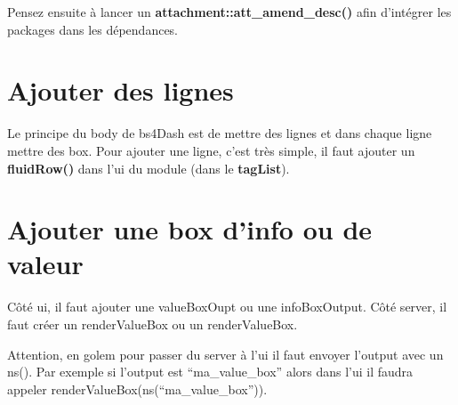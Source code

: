 \documentclass[
  letterpaper,
  DIV=11,
  numbers=noendperiod]{scrreprt}
\newenvironment{Shaded}{\begin{snugshade}}{\end{snugshade}}
\newcommand{\ControlFlowTok}[1]{\textcolor[rgb]{0.00,0.23,0.31}{#1}}
\newcommand{\FunctionTok}[1]{\textcolor[rgb]{0.28,0.35,0.67}{#1}}
\newcommand{\NormalTok}[1]{\textcolor[rgb]{0.00,0.23,0.31}{#1}}
\newcommand{\OtherTok}[1]{\textcolor[rgb]{0.00,0.23,0.31}{#1}}
\newcommand{\SpecialCharTok}[1]{\textcolor[rgb]{0.37,0.37,0.37}{#1}}
\newcommand{\StringTok}[1]{\textcolor[rgb]{0.13,0.47,0.30}{#1}}
\begin{document}
\begin{Shaded}
\end{Shaded}

Pensez ensuite à lancer un \textbf{attachment::att\_amend\_desc()} afin
d'intégrer les packages dans les dépendances.

\hypertarget{ajouter-des-lignes}{%
\section{Ajouter des lignes}\label{ajouter-des-lignes}}

Le principe du body de bs4Dash est de mettre des lignes et dans chaque
ligne mettre des box. Pour ajouter une ligne, c'est très simple, il faut
ajouter un \textbf{fluidRow()} dans l'ui du module (dans le
\textbf{tagList}).

\hypertarget{ajouter-une-box-dinfo-ou-de-valeur}{%
\section{Ajouter une box d'info ou de
valeur}\label{ajouter-une-box-dinfo-ou-de-valeur}}

Côté ui, il faut ajouter une valueBoxOupt ou une infoBoxOutput. Côté
server, il faut créer un renderValueBox ou un renderValueBox.

Attention, en golem pour passer du server à l'ui il faut envoyer
l'output avec un ns(). Par exemple si l'output est ``ma\_value\_box''
alors dans l'ui il faudra appeler
renderValueBox(ns(``ma\_value\_box'')).
\end{document}
